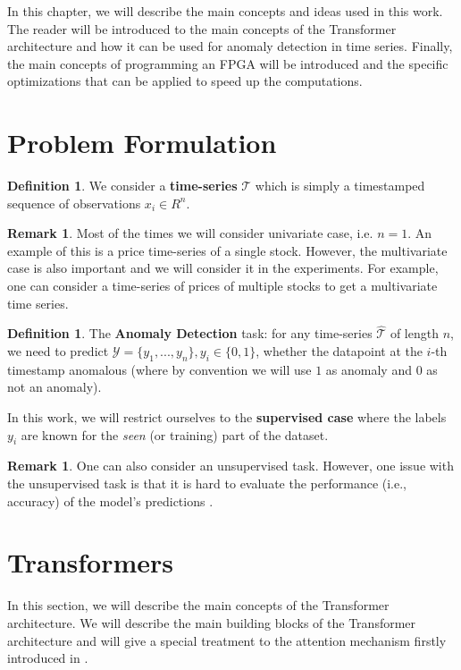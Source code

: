 \documentclass[a4paper, twoside]{report}
\theoremstyle{definition}
\newtheorem{definition}[theorem]{Definition}
\newtheorem{remark}[theorem]{Remark}
\numberwithin{equation}{section}
\begin{document}
In this chapter, we will describe the main concepts and ideas used in this work.
The reader will be introduced to the main concepts of the Transformer architecture and how it can be used for anomaly detection in time series.
Finally, the main concepts of programming an FPGA will be introduced and the specific optimizations that can be applied to speed up the computations.

\section{Problem Formulation}


\begin{definition}
    We consider a \textbf{time-series} $\mathcal{T}$ which is simply a timestamped sequence of observations $x_i \in R^n$.
\end{definition}
\begin{remark}
    Most of the times we will consider univariate case, i.e. $n=1$.
    An example of this is a price time-series of a single stock.
    However, the multivariate case is also important and we will consider it in the experiments.
    For example, one can consider a time-series of prices of multiple stocks to get a multivariate time series.
\end{remark}


\begin{definition}
    The \textbf{Anomaly Detection} task:
    for any time-series $\hat{\mathcal{T}}$ of length $n$, we need to predict $\mathcal{Y} = \{y_1, . . . , y_n \}, y_i \in \{0, 1\}$,
    whether the datapoint at the $i$-th timestamp anomalous (where by convention we will use $1$ as anomaly and $0$ as not an anomaly).
\end{definition}
In this work, we will restrict ourselves to the \textbf{supervised case}
where the labels $y_i$ are known for the \emph{seen} (or training) part of the dataset.

\begin{remark}
    One can also consider an unsupervised task.
    However, one issue with the unsupervised task is that it is hard to evaluate
    the performance (i.e., accuracy) of the model's predictions \cite{1905.05667}.
\end{remark}


\section{Transformers}

In this section, we will describe the main concepts of the Transformer architecture.
We will describe the main building blocks of the Transformer architecture
and will give a special treatment to the attention mechanism firstly introduced in \cite{1409.0473}.
\end{document}

